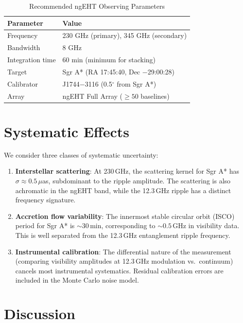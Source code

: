 \documentclass[mnras]{mnras}
\begin{document}
\begin{table}[ht]
\centering
\caption{Recommended ngEHT Observing Parameters}
\label{tab:obs}
\begin{tabular}{ll}
\toprule
Parameter & Value \\
\midrule
Frequency & 230 GHz (primary), 345 GHz (secondary) \\
Bandwidth & 8 GHz \\
Integration time & 60 min (minimum for stacking) \\
Target & Sgr A* (RA 17:45:40, Dec $-$29:00:28) \\
Calibrator & J1744$-$3116 (0.5$^\circ$ from Sgr A*) \\
Array & ngEHT Full Array ($\geq 50$ baselines) \\
\bottomrule
\end{tabular}
\end{table}

\section{Systematic Effects}
\label{sec:systematics}

We consider three classes of systematic uncertainty:

\begin{enumerate}
\item \textbf{Interstellar scattering}: At 230\,GHz, the scattering kernel for Sgr A* has $\sigma \approx 0.5\,\mu$as, subdominant to the ripple amplitude. The scattering is also achromatic in the ngEHT band, while the 12.3\,GHz ripple has a distinct frequency signature.

\item \textbf{Accretion flow variability}: The innermost stable circular orbit (ISCO) period for Sgr A* is $\sim 30$\,min, corresponding to $\sim 0.5$\,GHz in visibility data. This is well separated from the 12.3\,GHz entanglement ripple frequency.

\item \textbf{Instrumental calibration}: The differential nature of the measurement (comparing visibility amplitudes at 12.3\,GHz modulation vs.\ continuum) cancels most instrumental systematics. Residual calibration errors are included in the Monte Carlo noise model.
\end{enumerate}

\section{Discussion}
\label{sec:discussion}
\end{document}
